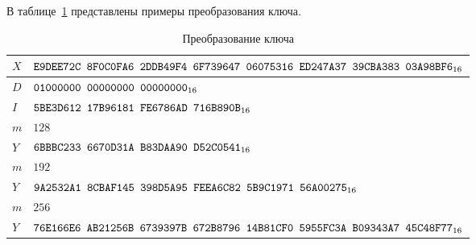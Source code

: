\label{TEST.KeyRep}

В таблице~\ref{Table.TEST.KeyRep} представлены примеры преобразования ключа.

\begin{table}[H]
\caption{Преобразование ключа}\label{Table.TEST.KeyRep}
\begin{tabular}{|l|l|}
\hline
$X$ & 
$\texttt{E9DEE72C~8F0C0FA6~2DDB49F4~6F739647~06075316~ED247A37~39CBA383~03A98BF6}_{16}$\\
\hline
$D$ &
$\texttt{01000000~00000000~00000000}_{16}$\\
\hline
$I$ &
$\texttt{5BE3D612~17B96181~FE6786AD~716B890B}_{16}$\\
\ddhline
$m$ & 
$128$\\
\dhline
$Y$ &
$\texttt{6BBBC233~6670D31A~B83DAA90~D52C0541}_{16}$\\
\ddhline
$m$ & 
$192$\\
\dhline
$Y$ &
$\texttt{9A2532A1~8CBAF145~398D5A95~FEEA6C82~5B9C1971~56A00275}_{16}$\\
\ddhline
$m$ & 
$256$\\
\dhline
$Y$ &
$\texttt{76E166E6~AB21256B~6739397B~672B8796~14B81CF0~5955FC3A~B09343A7~45C48F77}_{16}$\\
\hline
\end{tabular}
\end{table}
